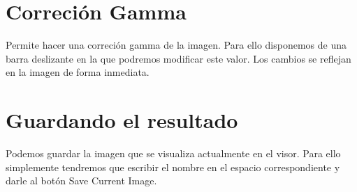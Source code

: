 \documentclass{article}
\begin{document}
\section{Correci\'on Gamma}
Permite hacer una correci\'on gamma de la imagen. Para ello disponemos de una barra deslizante en la que podremos modificar este valor. Los cambios se reflejan en la imagen de forma inmediata.

\section{Guardando el resultado}
Podemos guardar la imagen que se visualiza actualmente en el visor. Para ello simplemente tendremos que escribir el nombre en el espacio correspondiente y darle al bot\'on Save Current Image.
\end{document}
